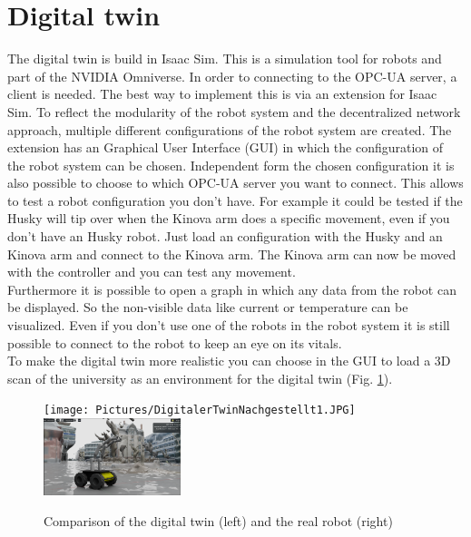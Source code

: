 \documentclass[conference]{IEEEtran}
\begin{document}
\section{Digital twin}
The digital twin is build in Isaac Sim.
This is a simulation tool for robots and part of the NVIDIA Omniverse.
In order to connecting to the OPC-UA server, a client is needed.
The best way to implement this is via an extension for Isaac Sim.
To reflect the modularity of the robot system and the decentralized network approach, multiple different configurations of the robot system are created.
The extension has an Graphical User Interface (GUI) in which the configuration of the robot system can be chosen.
Independent form the chosen configuration it is also possible to choose to which OPC-UA server you want to connect.
This allows to test a robot configuration you don't have. 
For example it could be tested if the Husky will tip over when the Kinova arm does a specific movement, even if you don't have an Husky robot.
Just load an configuration with the Husky and an Kinova arm and connect to the Kinova arm.
The Kinova arm can now be moved with the controller and you can test any movement.\\
Furthermore it is possible to open a graph in which any data from the robot can be displayed.
So the non-visible data like current or temperature can be visualized.
Even if you don't use one of the robots in the robot system it is still possible to connect to the robot to keep an eye on its vitals.\\
To make the digital twin more realistic you can choose in the GUI to load a 3D scan of the university as an environment for the digital twin (Fig. \ref{fig:CompareDigitalReal}).
\begin{figure}[htbp]
    \centerline{\texttt{[image: Pictures/DigitalerTwinNachgestellt1.JPG]}\includegraphics[width=4cm]{Pictures/DigitalerTwinNachgestellt2.png}}
    \caption{Comparison of the digital twin (left) and the real robot (right)}
    \label{fig:CompareDigitalReal}
\end{figure}
\end{document}
